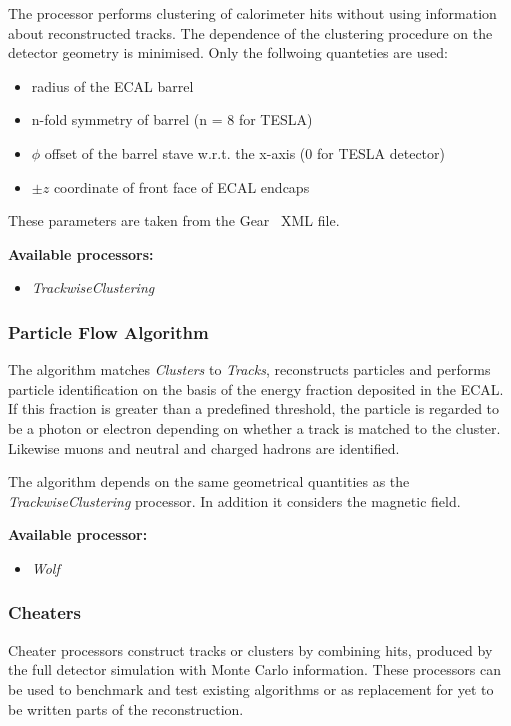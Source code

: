 The processor performs clustering of calorimeter hits without
using information about reconstructed tracks. 
The dependence of the clustering procedure on the detector
geometry is minimised. Only the follwoing quanteties are used: 
\begin{itemize}
\item radius of the ECAL barrel 
\item n-fold symmetry of barrel (n = 8 for TESLA)
\item $\phi$ offset of the barrel stave w.r.t. the x-axis 
      (0 for TESLA detector) 
\item $\pm z$ coordinate of front face of ECAL endcaps 
\end{itemize}
These parameters are taken from the Gear~\cite{ref_gear} XML file.

{\bf Available processors:} 
\begin{itemize}
\item {\em TrackwiseClustering}
\end{itemize}

\subsubsection{Particle Flow Algorithm}

The algorithm matches {\em Clusters} to {\em Tracks}, reconstructs particles 
and performs
particle identification on the basis of the energy fraction deposited 
in the ECAL. If this fraction is greater than a predefined threshold, 
the particle is regarded to be a photon or electron depending on 
whether a track is matched to the cluster.
Likewise muons and neutral and charged hadrons are identified. 

The algorithm depends on the same geometrical quantities as the 
{\em TrackwiseClustering} processor. In addition it considers the
magnetic field.

{\bf Available processor:} 
\begin{itemize}
\item {\em Wolf}
\end{itemize}

\subsubsection{Cheaters}

Cheater processors construct tracks or clusters by combining hits, produced 
by the full detector simulation with Monte Carlo information.
These processors can be used to benchmark and test existing algorithms
or as replacement for yet to be written parts of the reconstruction.

